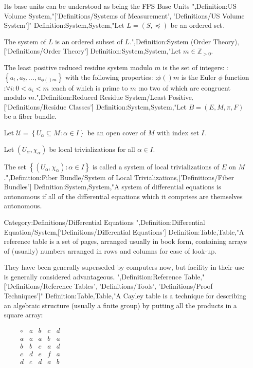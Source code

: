 Its base units can be understood as being the FPS Base Units
",Definition:US Volume System,"['Definitions/Systems of Measurement', 'Definitions/US Volume System']"
Definition:System,System,"Let $L = \left({S, \preceq}\right)$ be an ordered set.


The system of $L$ is an ordered subset of $L$.",Definition:System (Order Theory),['Definitions/Order Theory']
Definition:System,System,"Let $m \in \mathbb Z_{> 0}$.

The least positive reduced residue system modulo $m$ is the set of integers:
:$\left\lbrace a_1, a_2, \ldots, a_{\phi \left(   \right)m}  \right\rbrace$
with the following properties:
:$\phi \left(   \right)m$ is the Euler $\phi$ function
:$\forall i: 0 < a_i < m$
:each of which is prime to $m$
:no two of which are congruent modulo $m$.",Definition:Reduced Residue System/Least Positive,['Definitions/Residue Classes']
Definition:System,System,"Let $B = \left( E, M, \pi, F \right)$ be a fiber bundle. 

Let $\mathcal U = \left\lbrace U_\alpha \subseteq M: \alpha \in I \right\rbrace$ be an open cover of $M$ with index set $I$. 

Let $\left( U_\alpha, \chi_\alpha \right)$ be local trivializations for all $\alpha \in I$. 


The set $\left\lbrace \left( U_\alpha, \chi_\alpha \right): \alpha \in I \right\rbrace$ is called a system of local trivializations of $E$ on $M$.",Definition:Fiber Bundle/System of Local Trivializations,['Definitions/Fiber Bundles']
Definition:System,System,"A system of differential equations is autonomous if all of the differential equations which it comprises are themselves autonomous.


Category:Definitions/Differential Equations
",Definition:Differential Equation/System,['Definitions/Differential Equations']
Definition:Table,Table,"A reference table is a set of pages, arranged usually in book form, containing arrays of (usually) numbers arranged in rows and columns for ease of look-up.

They have been generally superseded by computers now, but facility in their use is generally considered advantageous.
",Definition:Reference Table,"['Definitions/Reference Tables', 'Definitions/Tools', 'Definitions/Proof Techniques']"
Definition:Table,Table,"A Cayley table is a technique for describing an algebraic structure (usually a finite group) by putting all the products in a square array:

$\qquad \begin {array} {c|cccc}
\circ & a & b & c & d \\
\hline
a & a & a & b & a \\
b & b & c & a & d \\
c & d & e & f & a \\
d & c & d & a & b \\
\end {array}$


